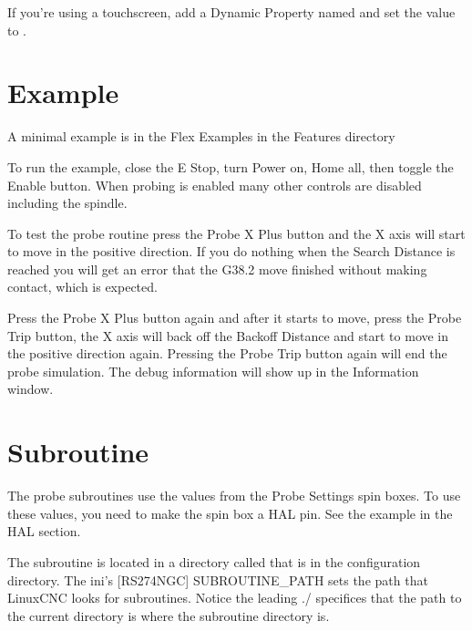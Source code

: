 \documentclass[letterpaper,10pt,english]{sphinxmanual}
\begin{document}
\sphinxAtStartPar
If you’re using a touch\sphinxhyphen{}screen, add a Dynamic Property named  and set
the value to .


\section{Example}
\label{\detokenize{probe:example}}
\sphinxAtStartPar
A minimal example is in the Flex Examples in the Features directory


\sphinxAtStartPar
To run the example, close the E Stop, turn Power on, Home all, then toggle the
Enable button. When probing is enabled many other controls are disabled
including the spindle.

\sphinxAtStartPar
To test the probe routine press the Probe X Plus button and the X axis will
start to move in the positive direction. If you do nothing when the Search
Distance is reached you will get an error that the G38.2 move finished without
making contact, which is expected.

\sphinxAtStartPar
Press the Probe X Plus button again and after it starts to move, press the Probe
Trip button, the X axis will back off the Backoff Distance and start to move in
the positive direction again. Pressing the Probe Trip button again will end the
probe simulation. The debug information will show up in the Information window.


\section{Subroutine}
\label{\detokenize{probe:subroutine}}
\sphinxAtStartPar
The probe subroutines use the values from the Probe Settings spin boxes. To use
these values, you need to make the spin box a HAL pin. See the {\hyperref[\detokenize{hal:spinboxtag}]{}}
example in the HAL section.

\sphinxAtStartPar
The subroutine is located in a directory called  that is in the
configuration directory. The ini’s {[}RS274NGC{]} SUBROUTINE\_PATH sets the path
that LinuxCNC looks for subroutines. Notice the leading ./ specifices that the
path to the current directory is where the subroutine directory is.

\begin{sphinxVerbatim}[commandchars=\\\{\}]
  
\end{sphinxVerbatim}
\end{document}
